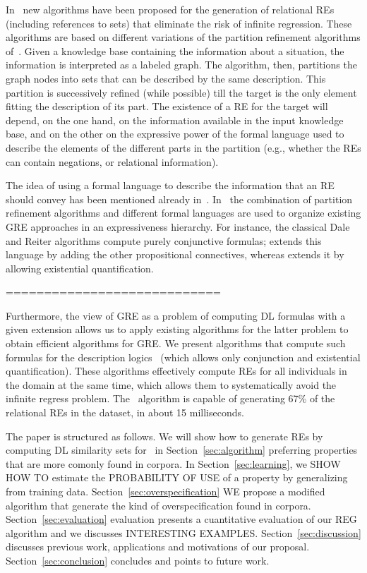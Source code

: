 In~\cite{arec:refe08,arec:usin11} new algorithms have been proposed for the generation 
of relational REs (including references to sets) that eliminate the risk of infinite regression. 
These algorithms are based on different variations of the partition refinement algorithms of~\cite{paig:thre87}.
Given a knowledge base containing the information about a situation, the information is 
interpreted as a labeled graph.  The algorithm, then, partitions the graph nodes into sets that can 
be described by the same description.  This partition is successively refined (while possible) till the target 
is the only element fitting the description of its part.  The existence of a RE for the target will 
depend, on the one hand, on the information available in the input knowledge base, and on the other 
on the expressive power of the formal language used to describe the elements of the different 
parts in the partition (e.g., whether the REs can contain negations, or relational information). 

The idea of using a formal language to describe the information that an RE should convey has been mentioned
already in~\cite{Krahmer2003,gardent07:_gener_bridg_defin_descr}.  In~\cite{arec:refe08,arec:usin11} the 
combination of partition refinement algorithms and different formal languages are used to organize existing 
GRE approaches in an expressiveness hierarchy.  For instance, the classical Dale and Reiter algorithms
compute purely conjunctive formulas; \cite{deemter02:_gener_refer_expres} extends this language by
adding the other propositional connectives, whereas\cite{dale91:_gener_refer_expres_invol_relat} extends it by
allowing existential quantification.


============================



Furthermore, the view of GRE as a problem of computing DL formulas
with a given extension allows us to apply existing algorithms for the
latter problem to obtain efficient algorithms for GRE.  We present
algorithms that compute such formulas for the description logics \el\
(which allows only conjunction and existential quantification).  These algorithms effectively
compute REs for all individuals in the domain at the same time, which
allows them to systematically avoid the infinite regress problem.  The
\el\ algorithm is capable of generating 67\% of the relational REs in
the \cite{viethen06:_algor_for_gener_refer_expres} dataset, in about
15 milliseconds.  


The paper is structured as follows. We will show how to generate REs by computing DL similarity sets for  \el\ in Section~\ref{sec:algorithm} preferring properties that are more comonly found in corpora.  In Section~\ref{sec:learning}, we SHOW HOW TO estimate the 
PROBABILITY OF USE of a property by generalizing from training data. Section~\ref{sec:overspecification}
WE propose a modified algorithm that generate the kind of overspecification found in corpora. Section~\ref{sec:evaluation} evaluation presents a cuantitative evaluation of our REG algorithm and we discusses INTERESTING EXAMPLES. Section~\ref{sec:discussion} discusses previous work, applications and motivations of our proposal. Section~\ref{sec:conclusion} concludes and points to future work.

